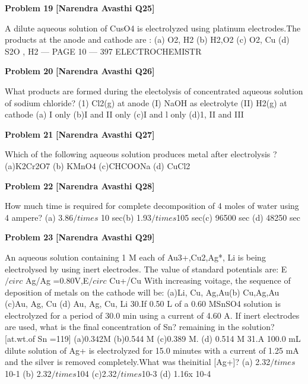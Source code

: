 \begin{problembox}
\textbf{Problem 19} \hfill \textbf{[Narendra Avasthi Q25]}
\label{q:ext-narendra_avasthi_all_questions-19}

A dilute aqueous solution of CusO4 is electrolyzed using platinum electrodes.The products at
the anode and cathode are :
(a) O2, H2
(b) H2,O2
(c) O2, Cu
(d) S2O , H2
--- PAGE 10 ---
397
ELECTROCHEMISTR
\end{problembox}

\begin{problembox}
\textbf{Problem 20} \hfill \textbf{[Narendra Avasthi Q26]}
\label{q:ext-narendra_avasthi_all_questions-20}

What products are formed during the electolysis of concentrated aqueous solution of sodium
chloride?
(1) Cl2(g) at anode
(I) NaOH as electrolyte
(II) H2(g) at cathode
(a) I only
(b)I and II only
(c)I and l only
(d)1, II and III
\end{problembox}

\begin{problembox}
\textbf{Problem 21} \hfill \textbf{[Narendra Avasthi Q27]}
\label{q:ext-narendra_avasthi_all_questions-21}

Which of the following aqueous solution produces metal after electrolysis ?
(a)K2Cr2O7
(b) KMnO4
(c)CHCOONa
(d) CuCl2
\end{problembox}

\begin{problembox}
\textbf{Problem 22} \hfill \textbf{[Narendra Avasthi Q28]}
\label{q:ext-narendra_avasthi_all_questions-22}

How much time is required for complete decomposition of 4 moles of water using 4 ampere?
(a) 3.86$/times$ 10 sec(b) 1.93$/times$105 sec(c) 96500 sec
(d) 48250 sec
\end{problembox}

\begin{problembox}
\textbf{Problem 23} \hfill \textbf{[Narendra Avasthi Q29]}
\label{q:ext-narendra_avasthi_all_questions-23}

An aqueous solution containing 1 M each of Au3+,Cu2,Ag*, Li is being electrolysed by
using inert electrodes. The value of standard potentials are:
E$/circ$
Ag/Ag
=0.80V,E$/circ$
Cu+/Cu
With increasing voitage, the sequence of deposition of metals on the cathode will be:
(a)Li, Cu, Ag,Au(b) Cu,Ag,Au
(c)Au, Ag, Cu
(d) Au, Ag, Cu, Li
30.If 0.50 L of a 0.60 MSnSO4 solution is electrolyzed for a period of 30.0 min using a current of
4.60 A. If inert electrodes are used, what is the final concentration of Sn? remaining in the
solution?[at.wt.of Sn =119]
(a)0.342M
(b)0.544 M
(c)0.389 M.
(d) 0.514 M
31.A 100.0 mL dilute solution of Ag+ is electrolyzed for 15.0 minutes with a current of 1.25 mA
and the silver is removed completely.What was theinitial [Ag+]?
(a) 2.32$/times$ 10-1
(b) 2.32$/times$104
(c)2.32$/times$10-3
(d) 1.16x 10-4
\end{problembox}

